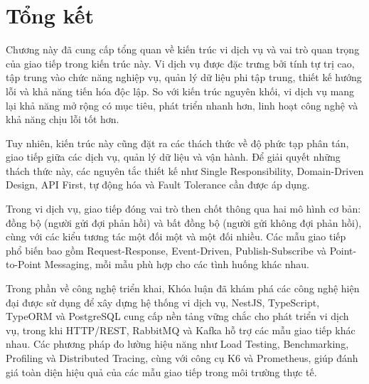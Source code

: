 \section{Tổng kết}

Chương này đã cung cấp tổng quan về kiến trúc vi dịch vụ và vai trò quan trọng của giao tiếp trong kiến trúc này. Vi dịch vụ được đặc trưng bởi tính tự trị cao, tập trung vào chức năng nghiệp vụ, quản lý dữ liệu phi tập trung, thiết kế hướng lỗi và khả năng tiến hóa độc lập. So với kiến trúc nguyên khối, vi dịch vụ mang lại khả năng mở rộng có mục tiêu, phát triển nhanh hơn, linh hoạt công nghệ và khả năng chịu lỗi tốt hơn.

Tuy nhiên, kiến trúc này cũng đặt ra các thách thức về độ phức tạp phân tán, giao tiếp giữa các dịch vụ, quản lý dữ liệu và vận hành. Để giải quyết những thách thức này, các nguyên tắc thiết kế như Single Responsibility, Domain-Driven Design, API First, tự động hóa và Fault Tolerance cần được áp dụng.

Trong vi dịch vụ, giao tiếp đóng vai trò then chốt thông qua hai mô hình cơ bản: đồng bộ (người gửi đợi phản hồi) và bất đồng bộ (người gửi không đợi phản hồi), cùng với các kiểu tương tác một đối một và một đối nhiều. Các mẫu giao tiếp phổ biến bao gồm Request-Response, Event-Driven, Publish-Subscribe và Point-to-Point Messaging, mỗi mẫu phù hợp cho các tình huống khác nhau.

Trong phần về công nghệ triển khai, Khóa luận đã khám phá các công nghệ hiện đại được sử dụng để xây dựng hệ thống vi dịch vụ, NestJS, TypeScript, TypeORM và PostgreSQL cung cấp nền tảng vững chắc cho phát triển vi dịch vụ, trong khi HTTP/REST, RabbitMQ và Kafka hỗ trợ các mẫu giao tiếp khác nhau. Các phương pháp đo lường hiệu năng như Load Testing, Benchmarking, Profiling và Distributed Tracing, cùng với công cụ K6 và Prometheus, giúp đánh giá toàn diện hiệu quả của các mẫu giao tiếp trong môi trường thực tế.